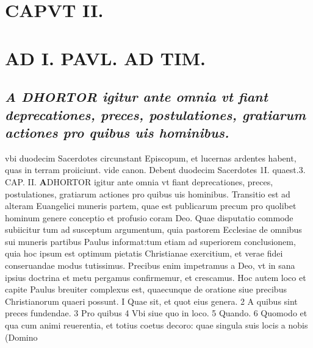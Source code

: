 \documentclass{article}
\begin{document}
\begin{pages}
\section{CAPVT  II. } 
\section*{AD I. PAVL. AD TIM. }
\marginpar{[ p.38 ]}\pstart {}
{}
\subsection*{\textit{A DHORTOR igitur ante omnia vt fiant deprecationes, preces, postulationes, gratiarum actiones pro quibus uis hominibus.}}vbi duodecim Sacerdotes circunstant Episcopum, et lucernas ardentes habent, quas in terram proiiciunt. vide canon. Debent duodecim Sacerdotes 1I. quaest.3. CAP. II.
\textbf{A}DHORTOR igitur ante omnia vt fiant deprecationes, preces, postulationes, gratiarum actiones pro quibus uis hominibus. Transitio est ad alteram Euangelici muneris partem, quae est publicarum precum pro quolibet hominum genere conceptio et profusio coram Deo. Quae disputatio commode subiicitur tum ad susceptum argumentum, quia pastorem Ecclesiae de omnibus sui muneris partibus Paulus informat:tum etiam ad superiorem conclusionem, quia hoc ipsum est optimum pietatis Christianae exercitium, et verae fidei conseruandae modus tutissimus. Precibus enim impetramus a Deo, vt in sana ipsius doctrina et metu pergamus confirmemur, et crescamus. Hoc autem loco et capite Paulus breuiter complexus est, quaecunque de oratione siue precibus Christianorum quaeri possunt. I Quae sit, et quot eius genera. 2 A quibus sint preces fundendae. 3 Pro quibus 4 Vbi siue quo in loco. 5 Quando. 6 Quomodo et qua cum animi reuerentia, et totius coetus decoro: quae singula suis locis a nobis (Domino  \pend

\end{pages}
\end{document}
